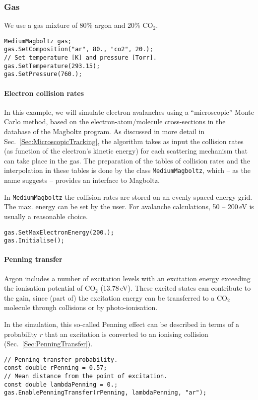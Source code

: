 \subsubsection{Gas}
We use a gas mixture of 80\% argon and 20\% CO\(_{2}\).
\begin{lstlisting}
MediumMagboltz gas;
gas.SetComposition("ar", 80., "co2", 20.);
// Set temperature [K] and pressure [Torr].
gas.SetTemperature(293.15);
gas.SetPressure(760.);
\end{lstlisting}
\paragraph{Electron collision rates}
In this example, we will simulate electron avalanches using 
a ``microscopic'' Monte Carlo method,
based on the electron-atom/molecule cross-sections in the database of the 
Magboltz program. 
As discussed in more detail in Sec.~\ref{Sec:MicroscopicTracking},
the algorithm takes as input the collision rates (as function of the 
electron's kinetic energy) for each scattering mechanism 
that can take place in the gas.
The preparation of the tables of collision rates and the interpolation 
in these tables is done by the class \texttt{MediumMagboltz}, which -- as
the name suggests -- provides an interface to Magboltz.

In \texttt{MediumMagboltz} the collision rates are stored on an
evenly spaced energy grid. The max. energy can be set by the user.
For avalanche calculations, 50 -- 200\,eV is usually a reasonable choice.
\begin{lstlisting}
gas.SetMaxElectronEnergy(200.);
gas.Initialise();
\end{lstlisting}
\paragraph{Penning transfer}
Argon includes a number of excitation levels with an excitation energy
exceeding the ionisation potential of CO$_{2}$ (13.78\,eV).
These excited states can contribute to the gain,
since (part of) the excitation energy can be transferred
to a CO$_2$ molecule through collisions or by photo-ionisation.

In the simulation, this so-called Penning effect can be described 
in terms of a probability $r$ that an excitation is converted to an 
ionising collision (Sec.~\ref{Sec:PenningTransfer}).
\begin{lstlisting}
// Penning transfer probability.
const double rPenning = 0.57;
// Mean distance from the point of excitation.
const double lambdaPenning = 0.;
gas.EnablePenningTransfer(rPenning, lambdaPenning, "ar");
\end{lstlisting}
